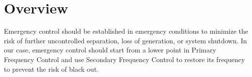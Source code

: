 \section{Overview} %
Emergency  control should be established in emergency conditions to minimize the risk of further uncontrolled separation, loss of generation, or system shutdown. In our case, emergency control should start from a lower point in Primary Frequency Control and use Secondary Frequency Control to restore its frequency to prevent the risk of black out.\\